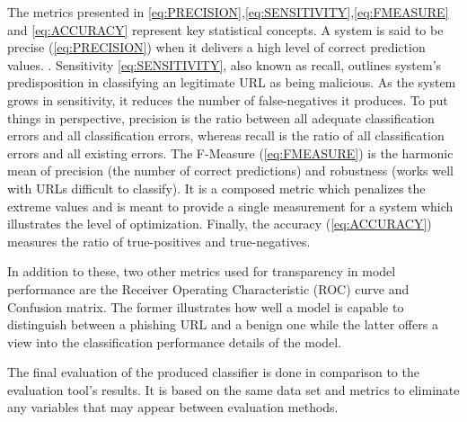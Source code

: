 The metrics presented in \ref{eq:PRECISION},\ref{eq:SENSITIVITY},\ref{eq:FMEASURE} and \ref{eq:ACCURACY} represent key statistical concepts. A system is said to be precise (\ref{eq:PRECISION}) when it delivers a high level of correct prediction values. . Sensitivity \ref{eq:SENSITIVITY}, also known as recall, outlines system's predisposition in classifying an legitimate URL as being malicious. As the system grows in sensitivity, it reduces the number of false-negatives it produces. To put things in perspective, precision is the ratio between all adequate classification errors and all classification errors, whereas recall is the ratio of all classification errors and all existing errors.
The F-Measure (\ref{eq:FMEASURE}) is the harmonic mean of precision (the number of correct predictions) and robustness (works well with URLs difficult to classify). It is a composed metric which penalizes the extreme values and is meant to provide a single measurement for a system which illustrates the level of optimization. Finally, the accuracy (\ref{eq:ACCURACY}) measures the ratio of true-positives and true-negatives.

In addition to these, two other metrics used for transparency in model performance are the Receiver Operating Characteristic (ROC) curve and Confusion matrix. The former illustrates how well a model is capable to distinguish between a phishing URL and a benign one while the latter offers a view into the classification performance details of the model.

The final evaluation of the produced classifier is done in comparison to the evaluation tool's results. It is based on the same data set and metrics to eliminate any variables that may appear between evaluation methods.

\iffalse
	1st module Whitelist/Blacklist
	Hash urls and do lookups as cheap as possible
	2nd module Heuristics
	Compile a set of heuristics from the papers based on performance
	3rd module Visual similarity/Content evaluation
	Think about studying the visual similarity or some content evaluation if feasible
	4th module Machine learning
	use Cohen's kappa static to measure agreement between stacked machine learning algos
	URL classifier (supervised learning)
	Domain classifier (trained with https://github.com/elceef/dnstwist)
	DGA classifier (optional)

	Figures must be correctly numbered with captions and paragraph text should not be wrapped around figures - same rules apply to tables. An example of figures can be found below.
	\begin{figure}[t]
		\centering
		\texttt{[image: unilogo.jpg]}
		\caption{Bournemouth University}
		\label{fig:BULogo3}
	\end{figure}
	You should always start with an overview (Heading 2 style) to tell what this chapter is about and finkish with a summary (Heading 2 style) to tell what has been covered in this chapter.

	This chapter is about discussing your project planning and methodology. Note that your chosen methodology should be based on the constraints and complexity of your project instead of some common senses with no link to your own project.]
\fi